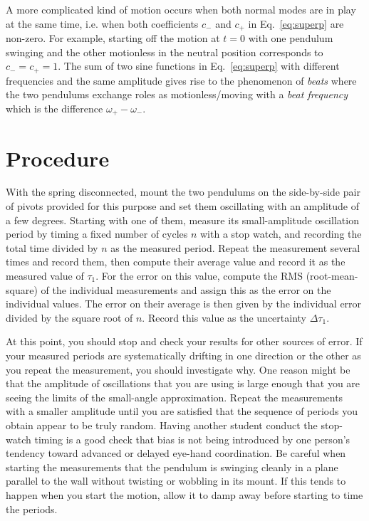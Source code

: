 \documentclass{revtex4}
\begin{document}
A more complicated kind of motion occurs when both normal modes are in
play at the same time, i.e. when both coefficients $c_-$ and $c_+$ in
Eq.~\ref{eq:superp} are non-zero.  For example, starting off the motion
at $t=0$ with one pendulum swinging and the other motionless in the
neutral position corresponds to $c_-=c_+=1$.  The sum of two sine functions
in Eq.~\ref{eq:superp} with different frequencies and the same amplitude
gives rise to the phenomenon of {\em beats} where the two pendulums
exchange roles as motionless/moving with a {\em beat frequency} which is
the difference $\omega_+-\omega_-$.

\section{Procedure}

With the spring disconnected, mount the two pendulums on the side-by-side
pair of pivots provided for this purpose and set them oscillating with an
amplitude of a few degrees.  Starting with one of them, measure its
small-amplitude oscillation period by timing a fixed number of cycles $n$
with a stop watch, and recording the total time divided by $n$ as the
measured period.  Repeat the measurement several times and record them,
then compute their average value and record it as the measured value of
$\tau_1$.  For the error on this value, compute the RMS (root-mean-square)
of the individual measurements and assign this as the error on the
individual values.  The error on their average is then given by the
individual error divided by the square root of $n$.  Record this value
as the uncertainty $\Delta\tau_1$.

At this point, you should stop and check your results for other sources
of error.  If your measured periods are systematically drifting in one
direction or the other as you repeat the measurement, you should
investigate why.  One reason might be that the amplitude of oscillations
that you are using is large enough that you are seeing the limits of the
small-angle approximation.  Repeat the measurements with a smaller 
amplitude until you are satisfied that the sequence of periods you obtain 
appear to be truly random.  Having another student conduct the stop-watch
timing is a good check that bias is not being introduced by one person's
tendency toward advanced or delayed eye-hand coordination.  Be careful
when starting the measurements that the pendulum is swinging cleanly in
a plane parallel to the wall without twisting or wobbling in its mount.
If this tends to happen when you start the motion, allow it to damp
away before starting to time the periods.
\end{document}
